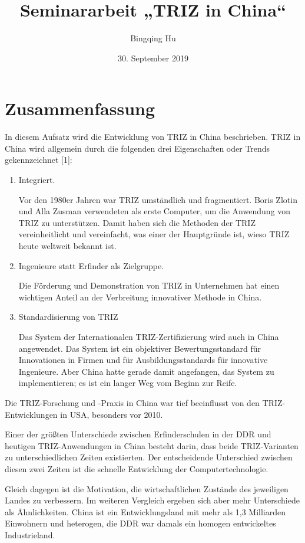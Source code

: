 \documentclass[11pt,a4paper]{article}
\title{Seminararbeit „TRIZ in China“}
\author{Bingqing Hu}
\date{30. September 2019}
\begin{document}
\maketitle
\tableofcontents

\section*{Zusammenfassung}
In diesem Aufsatz wird die Entwicklung von TRIZ in China beschrieben.  TRIZ in
China wird allgemein durch die folgenden drei Eigenschaften oder Trends
gekennzeichnet [1]:
\begin{enumerate}
\item Integriert.
  
Vor den 1980er Jahren war TRIZ umständlich und fragmentiert. Boris Zlotin und
Alla Zusman verwendeten als erste Computer, um die Anwendung von TRIZ zu
unterstützen.  Damit haben sich die Methoden der TRIZ vereinheitlicht und
vereinfacht, was einer der Hauptgründe ist, wieso TRIZ heute weltweit bekannt
ist.
\item Ingenieure statt Erfinder als Zielgruppe.
  
Die Förderung und Demonstration von TRIZ in Unternehmen hat einen wichtigen
Anteil an der Verbreitung innovativer Methode in China.
\item Standardisierung von TRIZ
  
Das System der Internationalen TRIZ-Zertifizierung wird auch in China
angewendet. Das System ist ein objektiver Bewertungsstandard für Innovationen
in Firmen und für Ausbildungsstandards für innovative Ingenieure. Aber China
hatte gerade damit angefangen, das System zu implementieren; es ist ein langer
Weg vom Beginn zur Reife.
\end{enumerate}

Die TRIZ-Forschung und -Praxis in China war tief beeinflusst von den
TRIZ-Entwicklungen in USA, besonders vor 2010.

Einer der größten Unterschiede zwischen Erfinderschulen in der DDR und
heutigen TRIZ-Anwendungen in China besteht darin, dass beide TRIZ-Varianten zu
unterschiedlichen Zeiten existierten.  Der entscheidende Unterschied zwischen
diesen zwei Zeiten ist die schnelle Entwicklung der Computertechnologie.

Gleich dagegen ist die Motivation, die wirtschaftlichen Zustände des
jeweiligen Landes zu verbessern.  Im weiteren Vergleich ergeben sich aber mehr
Unterschiede als Ähnlichkeiten. China ist ein Entwicklungsland mit mehr als
1,3 Milliarden Einwohnern und heterogen, die DDR war damals ein homogen
entwickeltes Industrieland.
\end{document}
